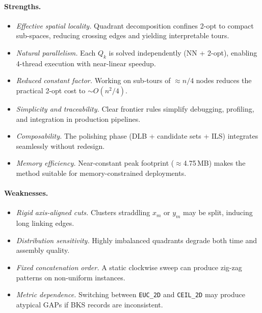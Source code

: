 \documentclass[runningheads]{llncs}
\begin{document}
\paragraph{Strengths.}
\begin{itemize}
  \item \textit{Effective spatial locality.} Quadrant decomposition
    confines 2-opt to compact sub-spaces, reducing crossing edges
    and yielding interpretable tours.
  \item \textit{Natural parallelism.} Each $Q_k$ is solved
    independently (NN + 2-opt), enabling 4-thread execution with
    near-linear speedup.
  \item \textit{Reduced constant factor.} Working on sub-tours of
    $\approx n/4$ nodes reduces the practical 2-opt cost to
    $\sim O(n^2/4)$.
  \item \textit{Simplicity and traceability.} Clear frontier rules
    simplify debugging, profiling, and integration in production
    pipelines.
  \item \textit{Composability.} The polishing phase (DLB +
    candidate sets + ILS) integrates seamlessly without redesign.
  \item \textit{Memory efficiency.} Near-constant peak footprint
    ($\approx$4.75\,MB) makes the method suitable for
    memory-constrained deployments.
\end{itemize}

\paragraph{Weaknesses.}
\begin{itemize}
  \item \textit{Rigid axis-aligned cuts.} Clusters straddling
    $x_m$ or $y_m$ may be split, inducing long linking edges.
  \item \textit{Distribution sensitivity.} Highly imbalanced
    quadrants degrade both time and assembly quality.
  \item \textit{Fixed concatenation order.} A static clockwise
    sweep can produce zig-zag patterns on non-uniform instances.
  \item \textit{Metric dependence.} Switching between
    \texttt{EUC\_2D} and \texttt{CEIL\_2D} may produce atypical
    GAPs if BKS records are inconsistent.
\end{itemize}
\end{document}
